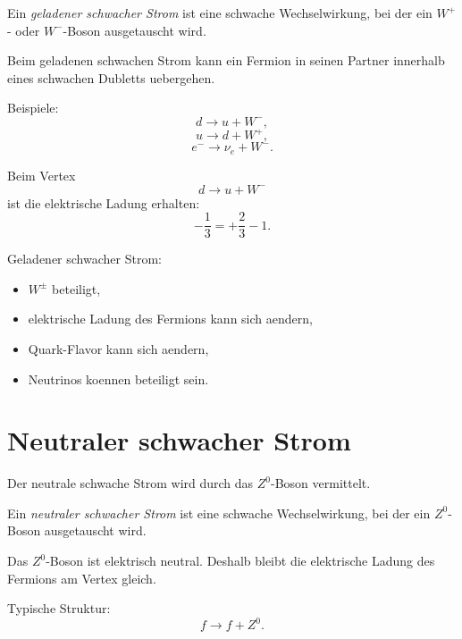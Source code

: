 \begin{definitionbox}
Ein \emph{geladener schwacher Strom} ist eine schwache Wechselwirkung, bei der ein
$W^+$- oder $W^-$-Boson ausgetauscht wird.
\end{definitionbox}

\begin{conceptbox}
Beim geladenen schwachen Strom kann ein Fermion in seinen Partner innerhalb eines
schwachen Dubletts uebergehen.

Beispiele:
\[
    d \rightarrow u + W^-,
\]
\[
    u \rightarrow d + W^+,
\]
\[
    e^- \rightarrow \nu_e + W^-.
\]
\end{conceptbox}

\begin{examplebox}
Beim Vertex
\[
    d \rightarrow u + W^-
\]
ist die elektrische Ladung erhalten:
\[
    -\frac{1}{3}
    =
    +\frac{2}{3}
    -
    1.
\]
\end{examplebox}

\begin{examtipbox}
Geladener schwacher Strom:
\begin{itemize}
    \item $W^\pm$ beteiligt,
    \item elektrische Ladung des Fermions kann sich aendern,
    \item Quark-Flavor kann sich aendern,
    \item Neutrinos koennen beteiligt sein.
\end{itemize}
\end{examtipbox}

\section{Neutraler schwacher Strom}

Der neutrale schwache Strom wird durch das $Z^0$-Boson vermittelt.

\begin{definitionbox}
Ein \emph{neutraler schwacher Strom} ist eine schwache Wechselwirkung, bei der ein
$Z^0$-Boson ausgetauscht wird.
\end{definitionbox}

\begin{conceptbox}
Das $Z^0$-Boson ist elektrisch neutral.
Deshalb bleibt die elektrische Ladung des Fermions am Vertex gleich.

Typische Struktur:
\[
    f \rightarrow f + Z^0.
\]
\end{conceptbox}

